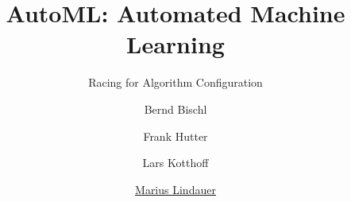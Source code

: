 




\title[AutoML: Overview]{AutoML: Automated Machine Learning}
\subtitle{Racing for Algorithm Configuration}
\author[Marius Lindauer]{Bernd Bischl \and Frank Hutter \and Lars Kotthoff \and \underline{Marius Lindauer}}
\institute{}
\date{}





	
	\maketitle
	
